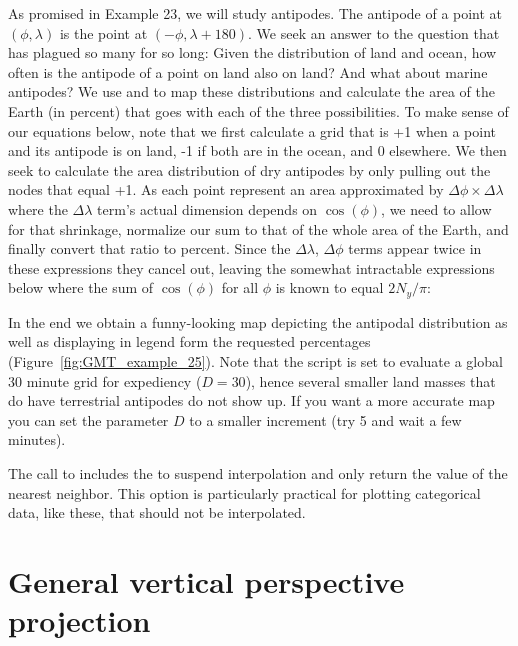 As promised in Example 23, we will study antipodes.  The antipode of a point at
$(\phi, \lambda)$ is the point at $(-\phi, \lambda + 180)$.  We seek an answer
to the question that has plagued so many for so long: Given the distribution of
land and ocean, how often is the antipode of a point on land also on land? And
what about marine antipodes?  We use  and 
to map these distributions and calculate the area of the Earth (in percent)
that goes with each of the three possibilities.  To make sense of our 
equations below, note that we first calculate a grid that is +1 when a point and its
antipode is on land, -1 if both are in the ocean, and 0 elsewhere.  We then
seek to calculate the area distribution of dry antipodes by only pulling out the nodes
that equal +1.  As each point represent an area approximated by $\Delta \phi \times \Delta \lambda$
where the $\Delta \lambda$ term's actual dimension depends on $\cos (\phi)$, we need
to allow for that shrinkage, normalize our sum to that of the whole area of the Earth,
and finally convert that ratio to percent.  Since the $\Delta \lambda$, $\Delta \phi$ terms
appear twice in these expressions they cancel out, leaving the somewhat
intractable expressions below where the sum of $\cos (\phi)$ for all $\phi$ is known to equal $2N_y / \pi$:


In the end we obtain a funny-looking map depicting the antipodal distribution as
well as displaying in legend form the requested percentages (Figure~\ref{fig:GMT_example_25}).
Note that the script is set to evaluate a global 30 minute grid for expediency ($D = 30$), hence
several smaller land masses that do have terrestrial antipodes do not show up.  If you want
a more accurate map you can set the parameter $D$ to a smaller increment (try 5 and wait a
few minutes).

The call to  includes the  to suspend interpolation and only
return the value of the nearest neighbor. This option is particularly practical for plotting
categorical data, like these, that should not be interpolated.



\section{General vertical perspective projection}

